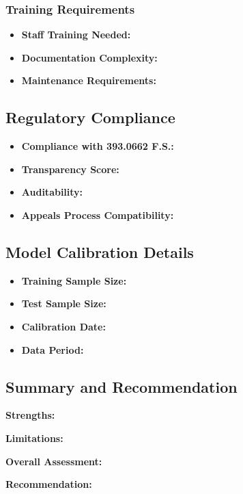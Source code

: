 \subsubsection{Training Requirements}
\begin{itemize}
    \item \textbf{Staff Training Needed:} \ModelStaffTraining
    \item \textbf{Documentation Complexity:} \ModelDocumentationComplexity
    \item \textbf{Maintenance Requirements:} \ModelMaintenanceRequirements
\end{itemize}

\subsection{Regulatory Compliance}

\begin{itemize}
    \item \textbf{Compliance with 393.0662 F.S.:} \ModelRegulatoryCompliance
    \item \textbf{Transparency Score:} \ModelTransparencyScore
    \item \textbf{Auditability:} \ModelAuditability
    \item \textbf{Appeals Process Compatibility:} \ModelAppealsCompatibility
\end{itemize}

\subsection{Model Calibration Details}

\begin{itemize}
    \item \textbf{Training Sample Size:} \TrainingSampleSize
    \item \textbf{Test Sample Size:} \TestSampleSize
    \item \textbf{Calibration Date:} \CalibrationDate
    \item \textbf{Data Period:} \DataPeriod
\end{itemize}

\subsection{Summary and Recommendation}

\ModelSummaryText

\noindent\textbf{Strengths:}
\begin{itemize}
    \ModelStrengthsList
\end{itemize}

\noindent\textbf{Limitations:}
\begin{itemize}
    \ModelLimitationsList
\end{itemize}

\noindent\textbf{Overall Assessment:} \ModelOverallAssessment

\noindent\textbf{Recommendation:} \ModelRecommendation